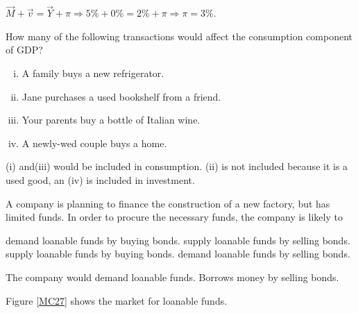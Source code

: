 \documentclass[addpoints,11pt]{exam}
\theoremstyle{definition}
\begin{document}
\begin{questions}
	\begin{solution} 
		$\vec{M} + \vec{v} = \vec{Y} + \pi \Rightarrow 5\% + 0\% = 2\% + \pi \Rightarrow \pi = 3\%$.
	\end{solution}
	
\newpage
	
	\question How many of the following transactions would affect the consumption component of GDP?
	
	\begin{enumerate}[(i)]
		\item A family buys a new refrigerator.
		\item Jane purchases a used bookshelf from a friend.
		\item Your parents buy a bottle of Italian wine.
		\item A newly-wed couple buys a home.
	\end{enumerate}
	
	\begin{choices}
	\end{choices}	
	
	\begin{solution}
		 (i) and(iii) would be included in consumption. (ii) is not included because it is a used good, an (iv) is included in investment.
	\end{solution}
	
	\question A company is planning to finance the construction of a new factory, but has limited funds. In order to procure the necessary funds, the company is likely to 
	
		\begin{choices}
			\choice demand loanable funds by buying bonds.
			\choice supply loanable funds by selling bonds.
			\choice supply loanable funds by buying bonds.
			\CorrectChoice demand loanable funds by selling bonds.
		\end{choices}
		
		\begin{solution} 
			The company would demand loanable funds. Borrows money by selling bonds.
		\end{solution}
		
	\question Figure \ref{MC27} shows the market for loanable funds. 


\end{questions}
\end{document}
